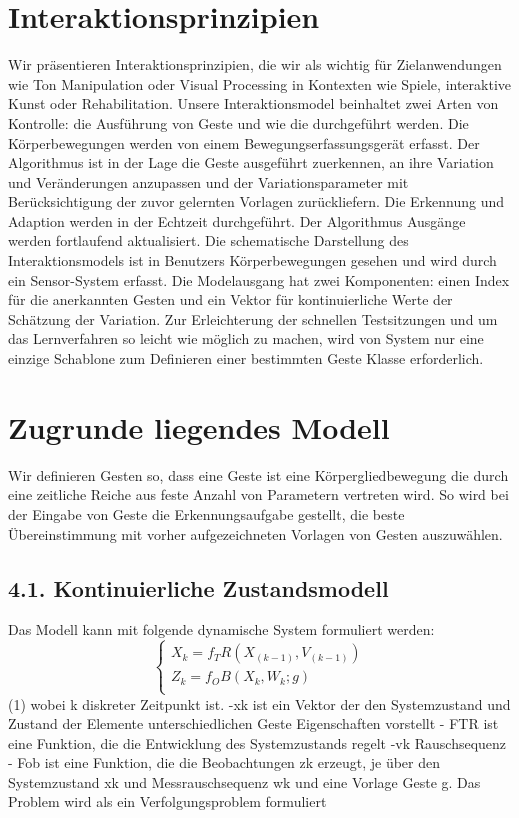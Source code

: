 \documentclass{llncs}
\begin{document}
\section{Interaktionsprinzipien}
Wir präsentieren Interaktionsprinzipien, die wir als wichtig für Zielanwendungen wie Ton Manipulation oder Visual Processing in Kontexten wie Spiele, interaktive Kunst oder Rehabilitation. Unsere Interaktionsmodel beinhaltet zwei Arten von Kontrolle: die Ausführung von Geste und wie die durchgeführt werden. Die Körperbewegungen werden von einem Bewegungserfassungsgerät erfasst. Der Algorithmus ist in der Lage die Geste ausgeführt zuerkennen, an ihre  Variation und Veränderungen anzupassen und der Variationsparameter mit Berücksichtigung der zuvor gelernten Vorlagen zurückliefern. Die Erkennung und Adaption werden in der Echtzeit durchgeführt. Der Algorithmus Ausgänge werden fortlaufend aktualisiert. Die schematische Darstellung des Interaktionsmodels ist in Benutzers Körperbewegungen gesehen und wird durch ein Sensor-System erfasst. Die Modelausgang hat zwei Komponenten:  einen Index für die anerkannten Gesten und ein Vektor für kontinuierliche Werte der Schätzung der Variation. Zur Erleichterung der schnellen Testsitzungen und um das Lernverfahren so leicht wie möglich zu machen, wird von System nur eine einzige Schablone zum Definieren einer bestimmten Geste Klasse erforderlich.

\section{Zugrunde liegendes Modell}
Wir definieren Gesten so, dass eine Geste ist eine Körpergliedbewegung die durch eine zeitliche Reiche aus feste Anzahl von Parametern vertreten wird. So wird bei der Eingabe von Geste die Erkennungsaufgabe gestellt, die beste Übereinstimmung mit vorher aufgezeichneten Vorlagen von Gesten auszuwählen.
\subsection{4.1. Kontinuierliche Zustandsmodell}
Das Modell kann mit folgende dynamische System formuliert werden:
\begin{equation}
\left\{\begin{array}{l}
X_k = f_TR(X_(k−1), V_(k−1))\\
Z_k = f_OB(X_k, W_k; g)\\
\end{array}\right.
\end{equation} 										(1)
wobei k diskreter Zeitpunkt ist.
-xk ist ein Vektor der den Systemzustand und Zustand der Elemente unterschiedlichen Geste Eigenschaften vorstellt
-   FTR ist eine Funktion, die die Entwicklung des Systemzustands regelt
-vk Rauschsequenz
- Fob ist eine Funktion, die die Beobachtungen zk erzeugt, je über den Systemzustand xk und Messrauschsequenz wk und eine Vorlage Geste g.
Das Problem wird als ein Verfolgungsproblem formuliert
\end{document}
